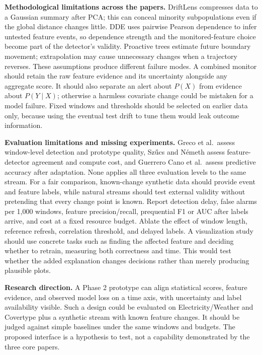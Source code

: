 \documentclass[10pt,a4paper]{article}
\begin{document}
\textbf{Methodological limitations across the papers.} DriftLens compresses data to a Gaussian summary after PCA; this can conceal minority subpopulations even if the global distance changes little. DDE uses pairwise Pearson dependence to infer untested feature events, so dependence strength and the monitored-feature choice become part of the detector's validity. Proactive trees estimate future boundary movement; extrapolation may cause unnecessary changes when a trajectory reverses. These assumptions produce different failure modes. A combined monitor should retain the raw feature evidence and its uncertainty alongside any aggregate score. It should also separate an alert about $P(X)$ from evidence about $P(Y\mid X)$; otherwise a harmless covariate change could be mistaken for a model failure. Fixed windows and thresholds should be selected on earlier data only, because using the eventual test drift to tune them would leak outcome information.

\textbf{Evaluation limitations and missing experiments.} Greco et al.\ assess window-level detection and prototype quality, Sz\H{u}cs and N\'emeth assess feature-detector agreement and compute cost, and Guerrero Cano et al.\ assess predictive accuracy after adaptation. None applies all three evaluation levels to the same stream. For a fair comparison, known-change synthetic data should provide event and feature labels, while natural streams should test external validity without pretending that every change point is known. Report detection delay, false alarms per 1,000 windows, feature precision/recall, prequential F1 or AUC after labels arrive, and cost at a fixed resource budget. Ablate the effect of window length, reference refresh, correlation threshold, and delayed labels. A visualization study should use concrete tasks such as finding the affected feature and deciding whether to retrain, measuring both correctness and time. This would test whether the added explanation changes decisions rather than merely producing plausible plots.

\textbf{Research direction.} A Phase 2 prototype can align statistical scores, feature evidence, and observed model loss on a time axis, with uncertainty and label availability visible. Such a design could be evaluated on Electricity/Weather and Covertype plus a synthetic stream with known feature changes. It should be judged against simple baselines under the same windows and budgets. The proposed interface is a hypothesis to test, not a capability demonstrated by the three core papers.
\end{document}
